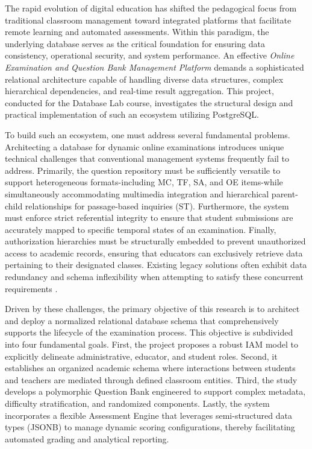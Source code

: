 \documentclass[../report_main.tex]{subfiles}
\begin{document}
The rapid evolution of digital education has shifted the pedagogical focus from traditional classroom management toward integrated platforms that facilitate remote learning and automated assessments. Within this paradigm, the underlying database serves as the critical foundation for ensuring data consistency, operational security, and system performance. An effective \textit{Online Examination and Question Bank Management Platform} demands a sophisticated relational architecture capable of handling diverse data structures, complex hierarchical dependencies, and real-time result aggregation. This project, conducted for the Database Lab course, investigates the structural design and practical implementation of such an ecosystem utilizing PostgreSQL.

To build such an ecosystem, one must address several fundamental problems. Architecting a database for dynamic online examinations introduces unique technical challenges that conventional management systems frequently fail to address. Primarily, the question repository must be sufficiently versatile to support heterogeneous formats-including \gls{MC}, \gls{TF}, \gls{SA}, and \gls{OE} items-while simultaneously accommodating multimedia integration and hierarchical parent-child relationships for passage-based inquiries (\gls{ST}). Furthermore, the system must enforce strict referential integrity to ensure that student submissions are accurately mapped to specific temporal states of an examination. Finally, authorization hierarchies must be structurally embedded to prevent unauthorized access to academic records, ensuring that educators can exclusively retrieve data pertaining to their designated classes. Existing legacy solutions often exhibit data redundancy and schema inflexibility when attempting to satisfy these concurrent requirements \cite{db_project_guidelines}.

Driven by these challenges, the primary objective of this research is to architect and deploy a normalized relational database schema that comprehensively supports the lifecycle of the examination process. This objective is subdivided into four fundamental goals. First, the project proposes a robust \gls{IAM} model to explicitly delineate administrative, educator, and student roles. Second, it establishes an organized academic schema where interactions between students and teachers are mediated through defined classroom entities. Third, the study develops a polymorphic Question Bank engineered to support complex metadata, difficulty stratification, and randomized components. Lastly, the system incorporates a flexible Assessment Engine that leverages semi-structured data types (JSONB) to manage dynamic scoring configurations, thereby facilitating automated grading and analytical reporting.
\end{document}

